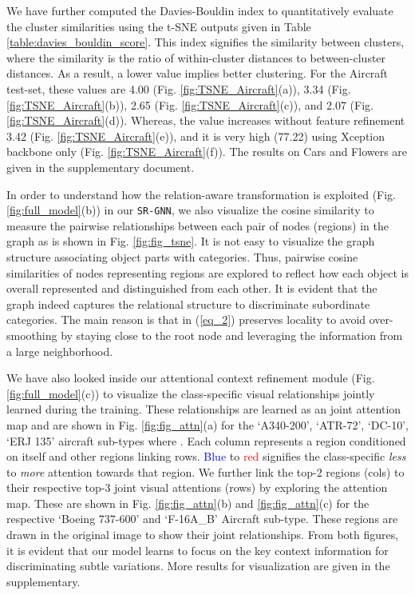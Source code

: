 \documentclass[journal]{IEEEtran}
\begin{document}
We have further computed the Davies-Bouldin index \cite{davies1979cluster} to quantitatively evaluate the cluster similarities using the t-SNE outputs given in Table \ref{table:davies_bouldin_score}. This index signifies the similarity between clusters, where the similarity is the ratio of within-cluster distances to between-cluster distances. As a result, a lower value implies better clustering. For the Aircraft test-set, these values are 4.00 (Fig. \ref{fig:TSNE_Aircraft}(a)), 3.34 (Fig. \ref{fig:TSNE_Aircraft}(b)), 2.65 (Fig. \ref{fig:TSNE_Aircraft}(c)), and 2.07 (Fig. \ref{fig:TSNE_Aircraft}(d)). Whereas, the value increases without feature refinement 3.42 (Fig. \ref{fig:TSNE_Aircraft}(e)), and it is very high (77.22) using Xception backbone only (Fig. \ref{fig:TSNE_Aircraft}(f)). The results on Cars and Flowers are given in the supplementary document.   

In order to understand how the relation-aware transformation is exploited (Fig. \ref{fig:full_model}(b)) in our \texttt{SR-GNN}, we also visualize the cosine similarity to measure the pairwise relationships between each pair of nodes (regions) in the graph as is shown in Fig. \ref{fig:fig_tsne}. It is not easy to visualize the graph structure associating object parts with categories. Thus, pairwise cosine similarities of nodes representing regions are explored to reflect how each object is overall represented and distinguished from each other. It is evident that the graph indeed captures the relational structure to discriminate subordinate categories. The main reason is that  in (\ref{eq_2}) preserves locality to avoid over-smoothing by staying close to the root node and leveraging the information from a large neighborhood.

We have also looked inside our attentional context refinement module (Fig. \ref{fig:full_model}(c)) to visualize the class-specific visual relationships jointly learned during the training. These relationships are learned as an  joint attention map and are shown in Fig. \ref{fig:fig_attn}(a) for the `A340-200', `ATR-72', `DC-10', `ERJ 135' aircraft  sub-types where . Each column represents a region conditioned on itself and other regions linking rows. \textcolor{blue}{Blue} to \textcolor{red}{red} signifies the class-specific \textit{less} to \textit{more} attention towards that region. We further link the top-2 regions (cols) to their respective top-3 joint visual attentions (rows) by exploring the attention map. These are shown in Fig. \ref{fig:fig_attn}(b) and \ref{fig:fig_attn}(c) for the respective `Boeing 737-600' and `F-16A\_B' Aircraft sub-type. These regions are drawn in the original image to show their joint relationships. From both figures, it is evident that our model learns to focus on the key context information for discriminating subtle variations. More results for visualization are given in the supplementary.  
\end{document}

